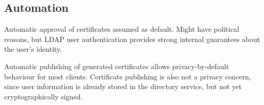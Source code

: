 \subsection*{Automation}
Automatic approval of certificates assumed as default.
Might have political reasons, but LDAP user authentication provides strong internal guarantees about the user's
identity.

Automatic publishing of generated certificates allows privacy-by-default behaviour for most clients.
Certificate publishing is also not a privacy concern, since user information is already stored in the directory service,
but not yet cryptographically signed.
